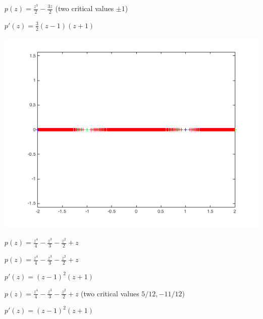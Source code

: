 \documentclass{beamer}
\begin{document}
\begin{frame}

$p(z)=\frac{z^3}{2}-\frac{3z}{2} $ (two critical values $\pm 1$)

\vspace{5mm}

$p'(z)=\frac{3}{2}(z-1)(z+1)$

\vspace{5mm}

\includegraphics[scale=.5]{one}

\end{frame}



\begin{frame}

$p(z)=\frac{z^4}{4} - \frac{z^3}{3} - \frac{z^2}{2} + z$

\end{frame}


\begin{frame}

$p(z)=\frac{z^4}{4} - \frac{z^3}{3} - \frac{z^2}{2} + z$

\vspace{5mm}

$p'(z)=(z-1)^2(z+1)$

\end{frame}


\begin{frame}

$p(z)=\frac{z^4}{4} - \frac{z^3}{3} - \frac{z^2}{2} + z$ (two critical values $5/12, -11/12$)

\vspace{5mm}

$p'(z)=(z-1)^2(z+1)$

\end{frame}
\end{document}

